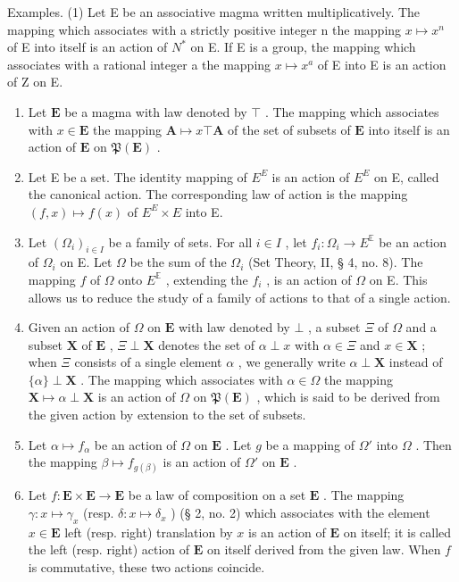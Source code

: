 Examples. (1) Let E be an associative magma written multiplicatively. The mapping which associates with a strictly positive integer n the mapping \(x \mapsto x^{n}\) of E into itself is an action of \(N^{*}\) on E. If E is a group, the mapping which associates with a rational integer a the mapping \(x \mapsto x^{a}\) of E into E is an action of Z on E.

\begin{enumerate}
\def\labelenumi{(\arabic{enumi})}
\setcounter{enumi}{1}
\item
  Let \(\mathbf{E}\) be a magma with law denoted by \(\top\) . The mapping which associates with \(x \in \mathbf{E}\) the mapping \(\mathbf{A} \mapsto x \top \mathbf{A}\) of the set of subsets of \(\mathbf{E}\) into itself is an action of \(\mathbf{E}\) on \(\mathfrak{P}(\mathbf{E})\) .
\item
  Let E be a set. The identity mapping of \(E^{E}\) is an action of \(E^{E}\) on E, called the canonical action. The corresponding law of action is the mapping \((f, x) \mapsto f(x)\) of \(E^{E} \times E\) into E.
\item
  Let \((\Omega_{i})_{i\in I}\) be a family of sets. For all \(i\in I\) , let \(f_{i}\colon \Omega_{i}\to E^{\mathbb{E}}\) be an action of \(\Omega_{i}\) on E. Let \(\Omega\) be the sum of the \(\Omega_{i}\) (Set Theory, II, § 4, no. 8). The mapping \(f\) of \(\Omega\) onto \(E^{\mathbb{E}}\) , extending the \(f_{i}\) , is an action of \(\Omega\) on E. This allows us to reduce the study of a family of actions to that of a single action.
\item
  Given an action of \(\Omega\) on \(\mathbf{E}\) with law denoted by \(\bot\) , a subset \(\Xi\) of \(\Omega\) and a subset \(\mathbf{X}\) of \(\mathbf{E}\) , \(\Xi \perp \mathbf{X}\) denotes the set of \(\alpha \perp x\) with \(\alpha \in \Xi\) and \(x \in \mathbf{X}\) ; when \(\Xi\) consists of a single element \(\alpha\) , we generally write \(\alpha \perp \mathbf{X}\) instead of \(\{\alpha\} \perp \mathbf{X}\) . The mapping which associates with \(\alpha \in \Omega\) the mapping \(\mathbf{X} \mapsto \alpha \perp \mathbf{X}\) is an action of \(\Omega\) on \(\mathfrak{P}(\mathbf{E})\) , which is said to be derived from the given action by extension to the set of subsets.
\item
  Let \(\alpha \mapsto f_{\alpha}\) be an action of \(\Omega\) on \(\mathbf{E}\) . Let \(g\) be a mapping of \(\Omega'\) into \(\Omega\) . Then the mapping \(\beta \mapsto f_{g(\beta)}\) is an action of \(\Omega'\) on \(\mathbf{E}\) .
\item
  Let \(f: \mathbf{E} \times \mathbf{E} \to \mathbf{E}\) be a law of composition on a set \(\mathbf{E}\) . The mapping \(\gamma: x \mapsto \gamma_x\) (resp. \(\delta: x \mapsto \delta_x\) ) (§ 2, no. 2) which associates with the element \(x \in \mathbf{E}\) left (resp. right) translation by \(x\) is an action of \(\mathbf{E}\) on itself; it is called the left (resp. right) action of \(\mathbf{E}\) on itself derived from the given law. When \(f\) is commutative, these two actions coincide.
\end{enumerate}

